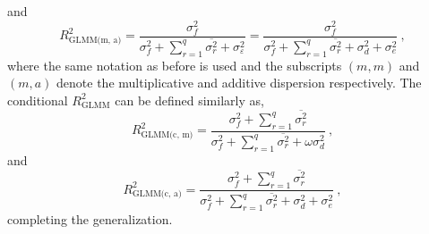 and
\begin{equation}
    \label{eq:R2_GLMM_m_a}
    R^2_{\text{GLMM(m, a)}} = \frac{\sigma^2_f}{\sigma^2_f + \sum_{r=1}^{q}\overline{\sigma^2_{r}} + \sigma^2_{\varepsilon}} = \frac{\sigma^2_f}{\sigma^2_f + \sum_{r=1}^{q}\overline{\sigma^2_{r}} + \sigma^2_{d} + \sigma^2_{e}}\ ,
\end{equation}
where the same notation as before is used and the subscripts $(m, m)$ and $(m, a)$ denote the multiplicative and additive dispersion respectively.
The conditional $R^2_{\text{GLMM}}$ can be defined similarly as,
\begin{equation}
    \label{eq:R2_GLMM_c_m}
    R^2_{\text{GLMM(c, m)}} = \frac{\sigma^2_f + \sum_{r=1}^{q}\overline{\sigma^2_{r}}}{\sigma^2_f + \sum_{r=1}^{q}\overline{\sigma^2_{r}} + \omega \sigma^2_{d}}\ ,
\end{equation}
and
\begin{equation}
    \label{eq:R2_GLMM_c_a}
    R^2_{\text{GLMM(c, a)}} = \frac{\sigma^2_f + \sum_{r=1}^{q}\overline{\sigma^2_{r}}}{\sigma^2_f + \sum_{r=1}^{q}\overline{\sigma^2_{r}} + \sigma^2_{d} + \sigma^2_{e}}\ ,
\end{equation}
completing the generalization. 

